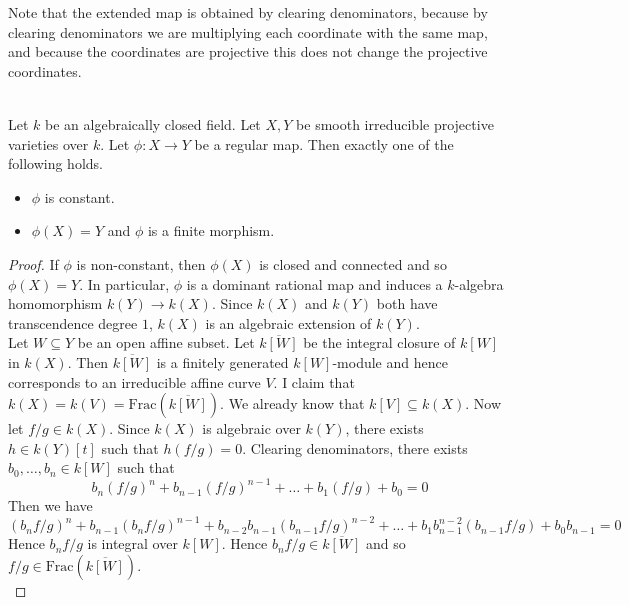 \documentclass[a4paper]{article}
\begin{document}
Note that the extended map is obtained by clearing denominators, because by clearing denominators we are multiplying each coordinate with the same map, and because the coordinates are projective this does not change the projective coordinates. 

\begin{prp}{}{}\\
Let $k$ be an algebraically closed field. Let $X,Y$ be smooth irreducible projective varieties over $k$. Let $\phi:X\to Y$ be a regular map. Then exactly one of the following holds. 
\begin{itemize}
\item $\phi$ is constant. 
\item $\phi(X)=Y$ and $\phi$ is a finite morphism. 
\end{itemize}
\begin{proof}
If $\phi$ is non-constant, then $\phi(X)$ is closed and connected and so $\phi(X)=Y$. In particular, $\phi$ is a dominant rational map and induces a $k$-algebra homomorphism $k(Y)\to k(X)$. Since $k(X)$ and $k(Y)$ both have transcendence degree $1$, $k(X)$ is an algebraic extension of $k(Y)$. \\

Let $W\subseteq Y$ be an open affine subset. Let $\overline{k[W]}$ be the integral closure of $k[W]$ in $k(X)$. Then $\overline{k[W]}$ is a finitely generated $k[W]$-module and hence corresponds to an irreducible affine curve $V$. I claim that $k(X)=k(V)=\text{Frac}(\overline{k[W]})$. We already know that $k[V]\subseteq k(X)$. Now let $f/g\in k(X)$. Since $k(X)$ is algebraic over $k(Y)$, there exists $h\in k(Y)[t]$ such that $h(f/g)=0$. Clearing denominators, there exists $b_0,\dots,b_n\in k[W]$ such that $$b_n(f/g)^n+b_{n-1}(f/g)^{n-1}+\dots+b_1(f/g)+b_0=0$$ Then we have $$(b_nf/g)^n+b_{n-1}(b_nf/g)^{n-1}+b_{n-2}b_{n-1}(b_{n-1}f/g)^{n-2}+\dots+b_1b_{n-1}^{n-2}(b_{n-1}f/g)+b_0b_{n-1}=0$$ Hence $b_nf/g$ is integral over $k[W]$. Hence $b_nf/g\in\overline{k[W]}$ and so $f/g\in\text{Frac}(\overline{k[W]})$. \\


\end{proof}
\end{prp}
\end{document}
